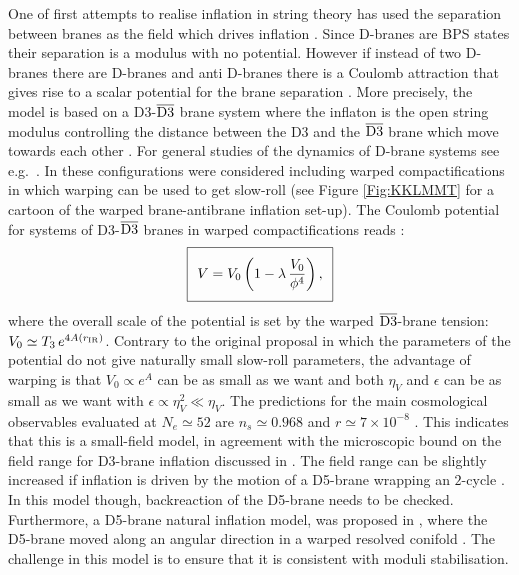 One of first attempts to realise inflation in string theory has used the separation between branes as the field which drives inflation \cite{Dvali:1998pa}. Since D-branes are BPS states their separation is a modulus with no potential. However if instead of two D-branes there are D-branes and anti D-branes there is a Coulomb attraction that gives rise to a scalar potential for the brane separation \cite{Burgess:2001fx,Dvali:2001fw}. More precisely, the model is based on a D3-$\overline{{\rm D3}}$ brane system where the inflaton is the open string modulus controlling the distance between the D3 and the $\overline{{\rm D3}}$ brane which move towards each other \cite{Burgess:2001fx,Dvali:2001fw}. For general studies of the dynamics of D-brane systems see e.g.~\cite{Burgess:2003qv, Burgess:2003mm, Burgess:2003tz, Easson:2007fz}. In \cite{Kachru:2003sx} these configurations were considered including warped compactifications in which warping can be used to get slow-roll (see Figure \ref{Fig:KKLMMT} for a cartoon of the warped brane-antibrane inflation set-up). The Coulomb potential for systems of D3-$\overline{{\rm D3}}$ branes in warped compactifications reads \cite{Kachru:2003sx}:
\begin{equation}
\setlength\fboxsep{0.25cm}
\setlength\fboxrule{0.4pt}
\boxed{
V = V_0 \left(1-\lambda\, \frac{V_0}{\phi^4}\right),
}
\label{Vbraneinfl}
\end{equation}
where the overall scale of the potential is set by the warped $\overline{{\rm D3}}$-brane tension: $V_0 \simeq T_3\,e^{4 A(r_{\rm IR})}$. Contrary to the original proposal in which the parameters of the potential do not give naturally small slow-roll parameters, 
the advantage of warping is that $V_0 \propto e^A$ can be as small as we want and both $\eta_V$ and $\epsilon$ can be as small as we want with $\epsilon \propto \eta_V^2 \ll \eta_V$. The predictions for the main cosmological observables evaluated at $N_e\simeq 52$ are $n_s\simeq 0.968$ and $r\simeq 7\times 10^{-8}$ \cite{Ma:2013xma}. 
This indicates that this is a small-field model,  in agreement with the microscopic bound on the field range for D3-brane inflation discussed in \cite{Baumann:2006cd}.  The field range can be slightly increased if  inflation is driven by the motion of a D5-brane wrapping an $2$-cycle \cite{Becker:2007ui}. In this model though, backreaction of the D5-brane needs to be checked. Furthermore, a D5-brane natural inflation model, was proposed in \cite{Kenton:2014gma}, where the D5-brane moved along an  angular direction in a warped resolved conifold \cite{PandoZayas:2000ctr,Klebanov:2007us}. The challenge in this model is to ensure that it is consistent with moduli stabilisation. 

